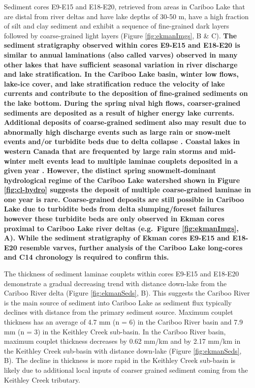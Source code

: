 \documentclass[Royal,times,doublespace,sageh]{sagej}
\begin{document}
Sediment cores E9-E15 and E18-E20, retrieved from areas in Cariboo Lake
that are distal from river deltas and have lake depths of 30-50 m, have
a high fraction of silt and clay sediment and exhibit a sequence of
fine-grained dark layers followed by coarse-grained light layers (Figure
\ref{fig:ekmanImgs}, B \& C). \textbf{The sediment stratigraphy observed
within cores E9-E15 and E18-E20 is similar to annual laminations (also
called varves) observed in many other lakes
\citep{Cockburn2008, Zolitschka2015a, Heideman2015, Hodder2006b, Desloges1999}
that have sufficient seasonal variation in river discharge and lake
stratification. In the Cariboo Lake basin, winter low flows, lake-ice
cover, and lake stratification reduce the velocity of lake currents and
contribute to the deposition of fine-grained sediments on the lake
bottom. During the spring nival high flows, coarser-grained sediments
are deposited as a result of higher energy lake currents. Additional
deposits of coarse-grained sediment also may result due to abnormally
high discharge events such as large rain or snow-melt events and/or
turbidite beds due to delta collapse \citep{sabatier2022}. Coastal lakes
in western Canada that are frequented by large rain storms and
mid-winter melt events lead to multiple laminae couplets deposited in a
given year \citep{Menounos2008c}. However, the distinct spring
snowmelt-dominant hydrological regime of the Cariboo Lake watershed
shown in Figure \ref{fig:cl-hydro} suggests the deposit of multiple
coarse-grained laminae in one year is rare. Coarse-grained deposits are
still possible in Cariboo Lake due to turbidite beds from delta
slumping/foreset failures however these turbidite beds are only observed
in Ekman cores proximal to Cariboo Lake river deltas (e.g.~Figure
\ref{fig:ekmanImgs}, A). While the sediment stratigraphy of Ekman cores
E9-E15 and E18-E20 resemble varves, further analysis of the Cariboo Lake
long-cores and C14 chronology is required to confirm this.}

The thickness of sediment laminae couplets within cores E9-E15 and
E18-E20 demonstrate a gradual decreasing trend with distance down-lake
from the Cariboo River delta (Figure \ref{fig:ekmanSeds}, B). This
suggests the Cariboo River is the main source of sediment into Cariboo
Lake as sediment flux typically declines with distance from the primary
sediment source. Maximum couplet thickness has an average of 4.7 mm (n =
6) in the Cariboo River basin and 7.9 mm (n = 3) in the Keithley Creek
sub-basin. In the Cariboo River basin, maximum couplet thickness
decreases by 0.62 mm/km and by 2.17 mm/km in the Keithley Creek
sub-basin with distance down-lake (Figure \ref{fig:ekmanSeds}, B). The
decline in thickness is more rapid in the Keithley Creek sub-basin is
likely due to additional local inputs of coarser grained sediment coming
from the Keithley Creek tributary.
\end{document}
